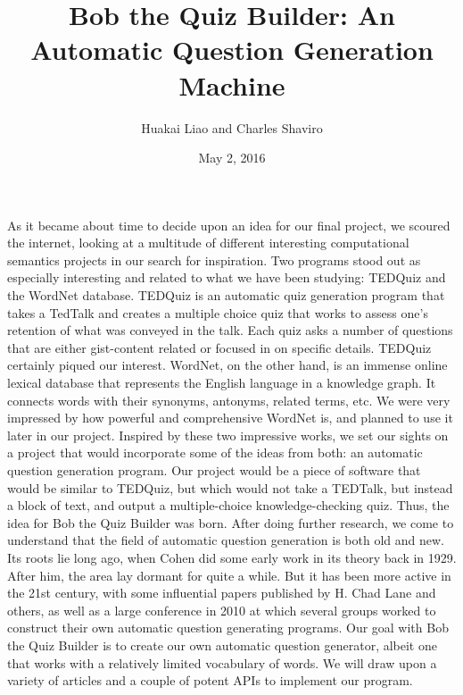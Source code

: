 \documentclass[finalcopy]{srpaper}
\title{Bob the Quiz Builder: An Automatic Question Generation Machine}
\author{Huakai Liao and Charles Shaviro}
\date{May 2, 2016}
\begin{document}
\texttt{} 
\frontmatter



%
%
\preface
 
As it became about time to decide upon an idea for our final project, we scoured the internet, looking at a multitude of different interesting computational semantics projects in our search for inspiration. Two programs stood out as especially interesting and related to what we have been studying: TEDQuiz and the WordNet database. 
\newline
TEDQuiz is an automatic quiz generation program that takes a TedTalk and creates a multiple choice quiz that works to assess one's retention of what was conveyed in the talk. Each quiz asks a number of questions that are either gist-content related or focused in on specific details. TEDQuiz certainly piqued our interest.
\newline
WordNet, on the other hand, is an immense online lexical database that represents the English language in a knowledge graph. It connects words with their synonyms, antonyms, related terms, etc. We were very impressed by how powerful and comprehensive WordNet is, and planned to use it later in our project.
\newline 
Inspired by these two impressive works, we set our sights on a project that would incorporate some of the ideas from both: an automatic question generation program. Our project would be a piece of software that would be similar to TEDQuiz, but which would not take a TEDTalk, but instead a block of text, and output a multiple-choice knowledge-checking quiz. Thus, the idea for Bob the Quiz Builder was born.
\newline
After doing further research, we come to understand that the field of automatic question generation is both old and new. Its roots lie long ago, when Cohen did some early work in its theory back in 1929. After him, the area lay dormant for quite a while. But it has been more active in the 21st century, with some influential papers published by H. Chad Lane and others, as well as a large conference in 2010 at which several groups worked to construct their own automatic question generating programs.
\newline
Our goal with Bob the Quiz Builder is to create our own automatic question generator, albeit one that works with a relatively limited vocabulary of words. We will draw upon a variety of articles and a couple of potent APIs to implement our program.
\end{document}
